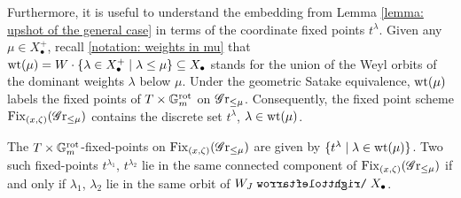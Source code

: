 Furthermore, it is useful to understand the embedding from Lemma \ref{lemma: upshot of the general case} in terms of the coordinate fixed points $t^{\lambda}$. Given any $\mu \in X^{+}_{\bullet}$, recall \eqref{notation: weights in mu} that 
$ \operatorname{wt}(\mu) = W \cdot \{ \lambda \in X^{+}_{\bullet} \mid \lambda \leq \mu \} \subseteq X_{\bullet}$
stands for the union of the Weyl orbits of the dominant weights $\lambda$ below $\mu$.
Under the geometric Satake equivalence, $\operatorname{wt}(\mu)$ labels the fixed points of $T \times \mathbb{G}_m^{\mathrm{rot}}$ on $\operatorname{\mathscr{G}r}_{\leq \mu}$.
Consequently, the fixed point scheme $\operatorname{Fix}_{(x, \zeta)}(\operatorname{\mathscr{G}r}_{\leq \mu})$ contains the discrete set $t^{\lambda}$, $\lambda \in \operatorname{wt}(\mu)$. 


\begin{lemma}\label{lemma: connected components of fixed points n affine schubert variety}
The $T\times \mathbb{G}_m^{\mathrm{rot}}$-fixed-points on $\operatorname{Fix}_{(x, \zeta)}(\operatorname{\mathscr{G}r}_{\leq \mu})$ are given by $\{ t^{\lambda} \mid \lambda \in \operatorname{wt}(\mu) \}$. Two such fixed-points $t^{\lambda_1}$, $t^{\lambda_2}$ lie in the same connected component of $\operatorname{Fix}_{(x, \zeta)}(\operatorname{\mathscr{G}r}_{\leq \mu})$ if and only if $\lambda_1$, $\lambda_2$ lie in the same orbit of $W_J \acts X_{\bullet}$.   
\end{lemma}
